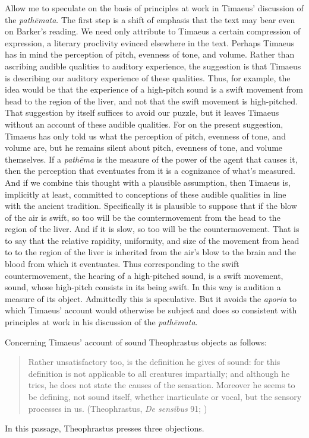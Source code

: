 Allow me to speculate on the basis of principles at work in Timaeus' discussion of the \emph{pathēmata}. The first step is a shift of emphasis that the text may bear even on Barker's reading. We need only attribute to Timaeus a certain compression of expression, a literary proclivity evinced elsewhere in the text. Perhaps Timaeus has in mind the perception of pitch, evenness of tone, and volume. Rather than ascribing audible qualities to auditory experience, the suggestion is that Timaeus is describing our auditory experience of these qualities. Thus, for example, the idea would be that the experience of a high-pitch sound is a swift movement from head to the region of the liver, and not that the swift movement is high-pitched. That suggestion by itself suffices to avoid our puzzle, but it leaves Timaeus without an account of these audible qualities. For on the present suggestion, Timaeus has only told us what the perception of pitch, evenness of tone, and volume are, but he remains silent about pitch, evenness of tone, and volume themselves. If a \emph{pathēma} is the measure of the power of the agent that causes it, then the perception that eventuates from it is a cognizance of what's measured. And if we combine this thought with a plausible assumption, then Timaeus is, implicitly at least, committed to conceptions of these audible qualities in line with the ancient tradition. Specifically it is plausible to suppose that if the blow of the air is swift, so too will be the countermovement from the head to the region of the liver. And if it is slow, so too will be the countermovement. That is to say that the relative rapidity, uniformity, and size of the movement from head to to the region of the liver is inherited from the air's blow to the brain and the blood from which it eventuates. Thus corresponding to the swift countermovement, the hearing of a high-pitched sound, is a swift movement, sound, whose high-pitch consists in its being swift. In this way is audition a measure of its object. Admittedly this is speculative. But it avoids the \emph{aporia} to which Timaeus' account would otherwise be subject and does so consistent with principles at work in his discussion of the \emph{pathēmata}. 

Concerning Timaeus' account of sound Theophrastus objects as follows:
\begin{quote}
	Rather unsatisfactory too, is the definition he gives of sound: for this definition is not applicable to all creatures impartially; and although he tries, he does not state the causes of the sensation. Moreover he seems to be defining, not sound itself, whether inarticulate or vocal, but the sensory processes in us. (Theophrastus, \emph{De sensibus} 91; \citealt[149]{Stratton:1917vn})
\end{quote}
In this passage, Theophrastus presses three objections. 

